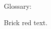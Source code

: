 \documentclass{article}
\begin{document}
Glossary: \provglossary

\textcolor{BrickRed}{Brick red text.}
\end{document}
